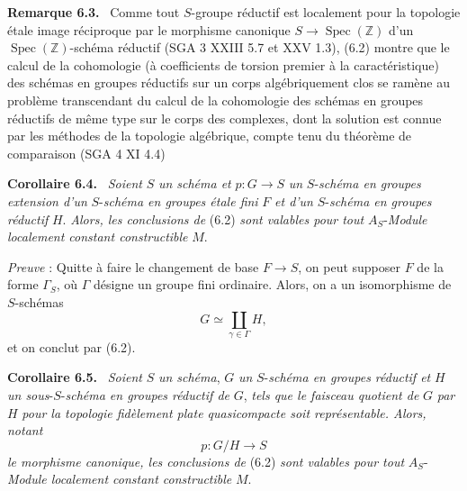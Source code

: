 \documentclass[11pt]{article}
\newenvironment{statement}[1]{\par\medskip\noindent\textbf{#1.}\ }{\par\medskip}
\begin{document}
\begin{statement}{Remarque 6.3}
Comme tout $S$-groupe réductif est localement pour la topologie étale image réciproque par le morphisme canonique $S\to\operatorname{Spec}(\mathbb Z)$ d'un $\operatorname{Spec}(\mathbb Z)$-schéma réductif (SGA 3 XXIII 5.7 et XXV 1.3), (6.2) montre que le calcul de la cohomologie (à coefficients de torsion premier à la caractéristique) des schémas en groupes réductifs sur un corps algébriquement clos se ramène au problème transcendant du calcul de la cohomologie des schémas en groupes réductifs de même type sur le corps des complexes, dont la solution est connue par les méthodes de la topologie algébrique, compte tenu du théorème de comparaison (SGA 4 XI 4.4)
\end{statement}

\begin{statement}{Corollaire 6.4}
\emph{Soient} $S$ \emph{un schéma et} $p:G\to S$ \emph{un} $S$-\emph{schéma en groupes extension d'un} $S$-\emph{schéma en groupes étale fini} $F$ \emph{et d'un} $S$-\emph{schéma en groupes réductif} $H$. \emph{Alors, les conclusions de} (6.2) \emph{sont valables pour tout} $A_S$-\emph{Module localement constant constructible} $M$.
\end{statement}

\emph{Preuve} : Quitte à faire le changement de base $F\to S$, on peut supposer $F$ de la forme $\Gamma_S$, où $\Gamma$ désigne un groupe fini ordinaire. Alors, on a un isomorphisme de $S$-schémas
\[
G\simeq\coprod_{\gamma\in\Gamma}H,
\]
et on conclut par (6.2).

\begin{statement}{Corollaire 6.5}
\emph{Soient} $S$ \emph{un schéma}, $G$ \emph{un} $S$-\emph{schéma en groupes réductif et} $H$ \emph{un sous}-$S$-\emph{schéma en groupes réductif de} $G$, \emph{tels que le faisceau quotient de} $G$ \emph{par} $H$ \emph{pour la topologie fidèlement plate quasicompacte soit représentable. Alors, notant}
\[
p:G/H\to S
\]
\emph{le morphisme canonique, les conclusions de} (6.2) \emph{sont valables pour tout} $A_S$-\emph{Module localement constant constructible} $M$.
\end{statement}
\end{document}
